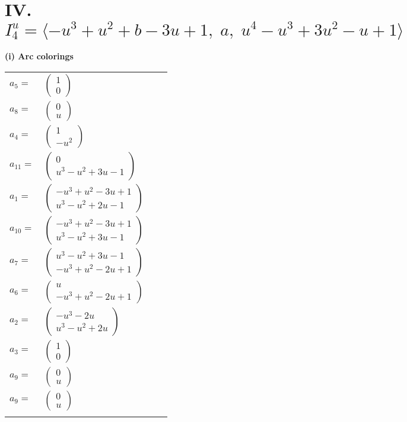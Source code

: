 \documentclass[1p]{elsarticle_modified}
\theoremstyle{definition}
\begin{document}
\centering \section*{IV. $I^u_{4}= \langle - u^3+u^2+b-3 u+1,\;a,\;u^4- u^3+3 u^2- u+1 \rangle$}
\flushleft \textbf{(i) Arc colorings}\\
\begin{tabular}{m{7pt} m{180pt} m{7pt} m{180pt} }
\flushright $a_{5}=$&$\begin{pmatrix}1\\0\end{pmatrix}$ \\
\flushright $a_{8}=$&$\begin{pmatrix}0\\u\end{pmatrix}$ \\
\flushright $a_{4}=$&$\begin{pmatrix}1\\- u^2\end{pmatrix}$ \\
\flushright $a_{11}=$&$\begin{pmatrix}0\\u^3- u^2+3 u-1\end{pmatrix}$ \\
\flushright $a_{1}=$&$\begin{pmatrix}- u^3+u^2-3 u+1\\u^3- u^2+2 u-1\end{pmatrix}$ \\
\flushright $a_{10}=$&$\begin{pmatrix}- u^3+u^2-3 u+1\\u^3- u^2+3 u-1\end{pmatrix}$ \\
\flushright $a_{7}=$&$\begin{pmatrix}u^3- u^2+3 u-1\\- u^3+u^2-2 u+1\end{pmatrix}$ \\
\flushright $a_{6}=$&$\begin{pmatrix}u\\- u^3+u^2-2 u+1\end{pmatrix}$ \\
\flushright $a_{2}=$&$\begin{pmatrix}- u^3-2 u\\u^3- u^2+2 u\end{pmatrix}$ \\
\flushright $a_{3}=$&$\begin{pmatrix}1\\0\end{pmatrix}$ \\
\flushright $a_{9}=$&$\begin{pmatrix}0\\u\end{pmatrix}$\\ \flushright $a_{9}=$&$\begin{pmatrix}0\\u\end{pmatrix}$\\&\end{tabular}
\end{document}
